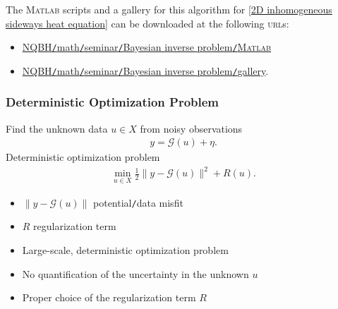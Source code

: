 \documentclass[oneside]{article}
\numberwithin{equation}{section}
\begin{document}
The \textsc{Matlab} scripts and a gallery for this algorithm for \eqref{2D inhomogeneous sideways heat equation} can be downloaded at the following \textsc{url}s:
\begin{itemize}
    \item \href{https://github.com/NQBH/miscellaneous/tree/master/math/seminar/Bayesian_inverse_problem/MATLAB}{NQBH\texttt{/}math\texttt{/}seminar\texttt{/}Bayesian inverse problem\texttt{/}\textsc{Matlab}}
    \item \href{https://github.com/NQBH/miscellaneous/tree/master/math/seminar/Bayesian_inverse_problem/gallery}{NQBH\texttt{/}math\texttt{/}seminar\texttt{/}Bayesian inverse problem\texttt{/}gallery}.
\end{itemize}

\subsubsection{Deterministic Optimization Problem}
Find the unknown data $u\in X$ from noisy observations
\begin{align*}
    y = \mathcal{G}(u) + \eta.
\end{align*}
Deterministic optimization problem
\begin{align*}
    \min_{u\in X} \frac{1}{2}\|y - \mathcal{G}(u)\|^2 + R(u).
\end{align*}
\begin{itemize}
    \item $\|y - \mathcal{G}(u)\|$ potential\texttt{/}data misfit
    \item $R$ regularization term
\end{itemize}
\begin{itemize}
    \item Large-scale, deterministic optimization problem
    \item No quantification of the uncertainty in the unknown $u$
    \item Proper choice of the regularization term $R$
\end{itemize}
\end{document}
